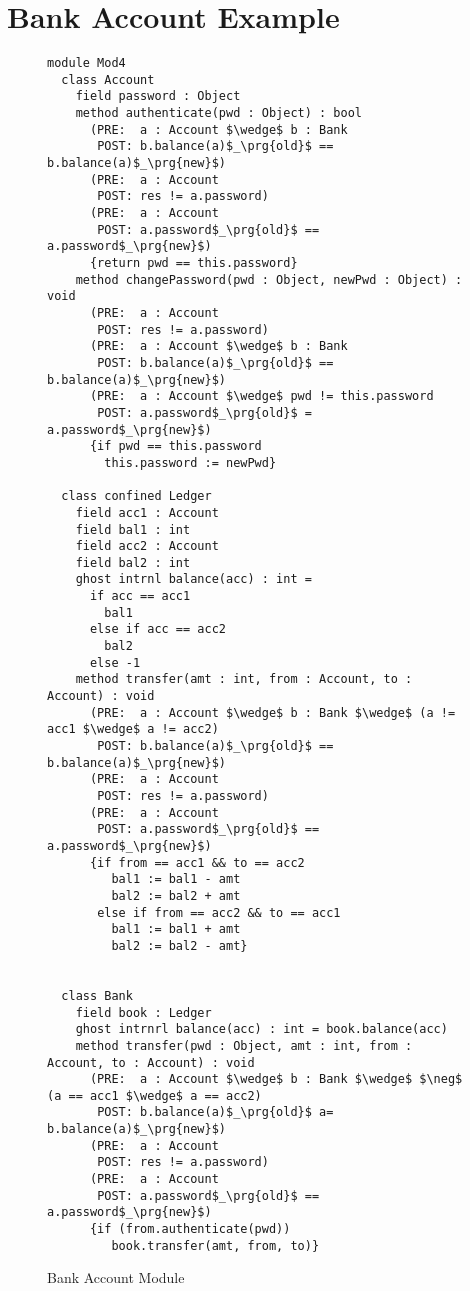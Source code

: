 \newpage
\section{Bank Account Example}
\label{app:BankAccount}


\begin{figure}[ht]
\begin{lstlisting}[mathescape=true, frame=lines]
module Mod4
  class Account
    field password : Object
    method authenticate(pwd : Object) : bool
      (PRE:  a : Account $\wedge$ b : Bank
       POST: b.balance(a)$_\prg{old}$ == b.balance(a)$_\prg{new}$)
      (PRE:  a : Account
       POST: res != a.password)
      (PRE:  a : Account
       POST: a.password$_\prg{old}$ == a.password$_\prg{new}$)
      {return pwd == this.password}
    method changePassword(pwd : Object, newPwd : Object) : void
      (PRE:  a : Account
       POST: res != a.password)
      (PRE:  a : Account $\wedge$ b : Bank
       POST: b.balance(a)$_\prg{old}$ == b.balance(a)$_\prg{new}$)
      (PRE:  a : Account $\wedge$ pwd != this.password
       POST: a.password$_\prg{old}$ = a.password$_\prg{new}$)
      {if pwd == this.password
        this.password := newPwd}

  class confined Ledger
    field acc1 : Account
    field bal1 : int
    field acc2 : Account
    field bal2 : int
    ghost intrnl balance(acc) : int = 
      if acc == acc1
        bal1
      else if acc == acc2
        bal2
      else -1
    method transfer(amt : int, from : Account, to : Account) : void
      (PRE:  a : Account $\wedge$ b : Bank $\wedge$ (a != acc1 $\wedge$ a != acc2)
       POST: b.balance(a)$_\prg{old}$ == b.balance(a)$_\prg{new}$)
      (PRE:  a : Account
       POST: res != a.password)
      (PRE:  a : Account
       POST: a.password$_\prg{old}$ == a.password$_\prg{new}$)
      {if from == acc1 && to == acc2
         bal1 := bal1 - amt
         bal2 := bal2 + amt
       else if from == acc2 && to == acc1
         bal1 := bal1 + amt
         bal2 := bal2 - amt}
      

  class Bank
    field book : Ledger
    ghost intrnrl balance(acc) : int = book.balance(acc)
    method transfer(pwd : Object, amt : int, from : Account, to : Account) : void
      (PRE:  a : Account $\wedge$ b : Bank $\wedge$ $\neg$ (a == acc1 $\wedge$ a == acc2)
       POST: b.balance(a)$_\prg{old}$ a= b.balance(a)$_\prg{new}$)
      (PRE:  a : Account
       POST: res != a.password)
      (PRE:  a : Account
       POST: a.password$_\prg{old}$ == a.password$_\prg{new}$)
      {if (from.authenticate(pwd))
         book.transfer(amt, from, to)}
\end{lstlisting}
\caption{Bank Account Module}
\label{f:ex-bank}
\end{figure}



